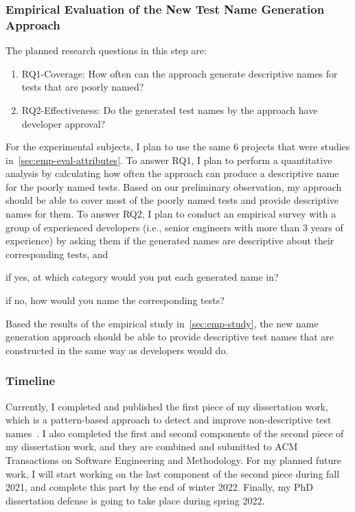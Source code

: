 \subsubsection{Empirical Evaluation of the New Test Name Generation Approach}

The planned research questions in this step are:
%
\begin{enumerate}
    \item RQ1-Coverage: How often can the approach generate descriptive names for tests that are poorly named?
    \item RQ2-Effectiveness: Do the generated test names by the approach have developer approval?
\end{enumerate}
%
For the experimental subjects, I plan to use the same \num{6} projects that were studies in~\cref{sec:emp-eval-attributes}.
%
To answer RQ1, I plan to perform a quantitative analysis by calculating how often the approach can produce a descriptive name for the poorly named tests.
%
Based on our preliminary observation, my approach should be able to cover most of the poorly named tests and provide descriptive names for them.
%
To answer RQ2, I plan to conduct an empirical survey with a group of experienced developers (i.e., senior engineers with more than \num{3} years of experience) by asking them if the generated names are descriptive about their corresponding tests, and
\begin{enumerate*}
    \item if yes, at which category would you put each generated name in?
    \item if no, how would you name the corresponding tests?
\end{enumerate*}
%
Based the results of the empirical study in~\cref{sec:emp-study}, the new name generation approach should be able to provide descriptive test names that are constructed in the same way as developers would do.


\subsubsection{Timeline}

Currently, I completed and published the first piece of my dissertation work, which is a pattern-based approach to detect and improve non-descriptive test names~\cite{wu2020pattern}.
%
I also completed the first and second components of the second piece of my dissertation work, and they are combined and submitted to ACM Transactions on Software Engineering and Methodology.
%
For my planned future work, I will start working on the last component of the second piece during fall 2021, and complete this part by the end of winter 2022.
%
Finally, my PhD dissertation defense is going to take place during spring 2022.